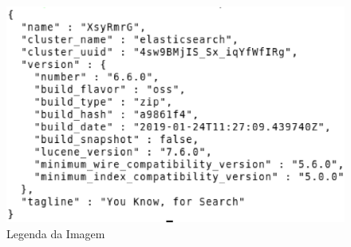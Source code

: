 \clearpage

\begin{figure}[!htb]
	\centering
	\includegraphics[scale=1]{imagens/pretty.eps}
	\caption{Legenda da Imagem}
	\label{Label de referência para a imagem}
\end{figure}
